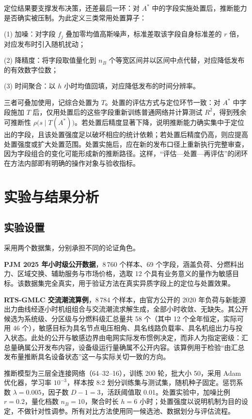 \documentclass[UTF8,zihao=5,twoside]{ctexart}
\begin{document}
定位结果要支撑发布决策，还差最后一环：对 $A^{\ast}$ 中的字段实施处置后，推断能力是否确实被压制。为此定义三类常用处置算子：

(1) 加噪：对字段 $f_j$ 叠加零均值高斯噪声，标准差取该字段自身标准差的 $r$ 倍，对应发布时引入随机扰动；

(2) 降精度：将字段取值量化到 $n_B$ 个等宽区间并以区间中点代替，对应降低发布的有效数字位数；

(3) 时间聚合：以 $h$ 小时均值回填，对应降低发布的时间分辨率。

三者可叠加使用，记综合处置为 $T$。处置的评估方式与定位环节一致：对 $A^{\ast}$ 中字段施加 $T$ 后，仅用处置后的这些字段重新训练普通网络并计算测试 $R^2$，得到残余可推断性 $\rho\big(s\mid T(A^{\ast})\big)$。若处置后精度显著下降，说明推断能力确实集中于定位出的字段，且该处置强度足以破坏相应的统计依赖；若处置后精度仍高，则应提高处置强度或扩大处置范围。处置实施后，应在新的发布口径上重新执行完整审查，因为字段组合的变化可能形成新的推断路径。这样，“评估—处置—再评估”的闭环在方法内部即有明确的操作对象与验收指标。

\section{实验与结果分析}

\subsection{实验设置}

采用两个数据集，分别承担不同的论证角色。

\textbf{PJM 2025 年小时级公开数据}\cite{ref-pjm-dataminer}，8\,760 个样本、69 个字段，涵盖负荷、分燃料出力、区域交换、辅助服务与市场价格，选取 12 个具有业务意义的量作为敏感目标。该数据集完全真实，用于验证方法在真实异质字段上的定位与处置效果。

\textbf{RTS-GMLC 交流潮流算例}\cite{ref-rtsgmlc}，8\,784 个样本，由官方公开的 2020 年负荷与新能源出力曲线经逐小时机组组合与交流潮流求解生成，全部小时收敛、无缺失。其公开候选为系统级、分区级与分燃料级汇总量共 58 个（其中 12 个全年恒定，实际可用 46 个），敏感目标为具名节点电压相角、具名线路负载率、具名机组出力与投入状态。此处的公开与敏感边界由电网实际发布惯例决定，而非人为指定密级：汇总量确属公开发布内容，设备级运行量确属不公开内容。该算例用于检验“由汇总发布量推断具名设备状态”这一与实际关切一致的方向。

推断模型为三层全连接网络（64--32--16），训练 200 轮，批大小 50，采用 Adam 优化器\cite{ref-kingma-adam}，学习率 $10^{-3}$，样本按 8:2 划分训练集与测试集，随机种子固定。惩罚系数 $\lambda=0.005$，因子数 $D-1=3$，活跃阈值取 0.01。处置实验中，加噪比例 $r=0.2$，量化档数 $n_B=10$，聚合时长 $h=6$ 小时；处置强度以说明机制为目的设定，不做针对性调参。所有对比方法使用同一候选池、数据划分与评估流程。
\end{document}
